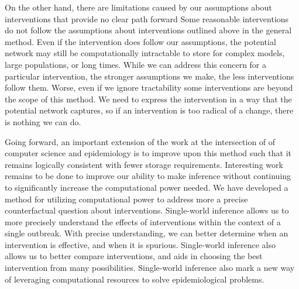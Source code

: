\documentclass[PTRSB]{rsos}
\begin{document}
\begin{multicols}{2}
On the other hand, there are limitations caused by our assumptions about interventions that provide no clear path forward
Some reasonable interventions do not follow the assumptions about interventions outlined above in the general method.
Even if the intervention does follow our assumptions, the potential network may still be computationally intractable to store for complex models, large populations, or long times.
While we can address this concern for a particular intervention, the stronger assumptions we make, the less interventions follow them.
Worse, even if we ignore tractability some interventions are beyond the scope of this method.
We need to express the intervention in a way that the potential network captures, so if an intervention is too radical of a change, there is nothing we can do.

Going forward, an important extension of the work at the intersection of of computer science and epidemiology is to improve upon this method such that it remains logically consistent with fewer storage requirements. 
Interesting work remains to be done to improve our ability to make inference without continuing to significantly increase the computational power needed.
We have developed a method for utilizing computational power to address more a precise counterfactual question about interventions. 
Single-world inference allows us to more precisely understand the effects of interventions within the context of a single outbreak. 
With precise understanding, we can better determine when an intervention is effective, and when it is spurious.
Single-world inference also allows us to better compare interventions, and aids in choosing the best intervention from many possibilities. 
Single-world inference also mark a new way of leveraging computational resources to solve epidemiological problems.

\enlargethispage{20pt}






\end{multicols}

\begin{multicols}{3}


\end{multicols}
\twocolumn
\end{document}
